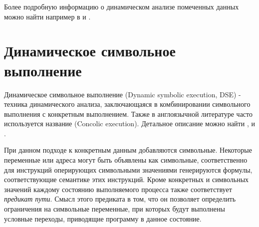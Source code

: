 Более подробную информацию о динамическом анализе помеченных данных можно найти например в \cite{Schwartz} и \cite{PBA}.






\section{Динамическое символьное выполнение}

Динамическое символьное выполнение (Dynamic symbolic execution, DSE) - техника динамического анализа, заключающаяся в комбинировании символьного выполнения с конкретным выполнением. Также в англоязычной литературе часто используется название (Concolic execution). Детальное описание можно найти \cite{Schwartz}, \cite{PBA} и \cite{SurveySymExec}.

При данном подходе к конкретным данным добавляются символьные. Некоторые переменные или адреса могут быть объявлены как символьные, соответственно для инструкций оперирующих символьными значениями генерируются формулы, соответствующие семантике этих инструкций. Кроме конкретных и символьных значений каждому состоянию выполняемого процесса также соответствует \emph{предикат пути}. Смысл этого предиката в том, что он позволяет определить ограничения на символьные переменные, при которых будут выполнены условные переходы, приводящие программу в данное состояние.

